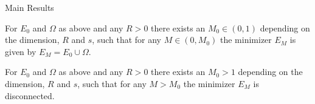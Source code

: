 \documentclass[9pt]{beamer}
\begin{document}
\begin{frame}{Main Results}
  \begin{theorem}
  \label{thm:003}
    For \( E_0 \) and \( \Omega \) as above and any \( R > 0 \) there exists an \( M_0 \in (0, 1) \)
	  depending on the dimension, \( R \) and \( s \), such that for any \( M \in (0, M_0) \) the
	  minimizer \( E_M \) is given by \( E_M = E_0 \cup \Omega \).
  \end{theorem}

  \begin{theorem}
  \label{thm:004}
    For \( E_0 \) and \( \Omega \) as above and any \( R > 0 \) there exists an \( M_0 > 1 \)
	  depending on the dimension, \( R \) and \( s \), such that for any \( M > M_0 \) the minimizer \(
	  E_M \) is disconnected.
  \end{theorem}
\end{frame}
\end{document}
